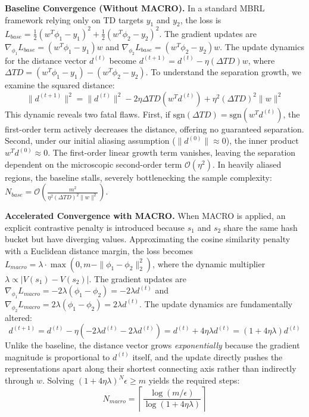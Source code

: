 \documentclass{article} %
\begin{document}
\textbf{Baseline Convergence (Without MACRO).}
In a standard MBRL framework relying only on TD targets $y_1$ and $y_2$, the loss is $L_{base} = \frac{1}{2}(w^T\phi_1 - y_1)^2 + \frac{1}{2}(w^T\phi_2 - y_2)^2$. The gradient updates are $\nabla_{\phi_1} L_{base} = (w^T\phi_1 - y_1)w$ and $\nabla_{\phi_2} L_{base} = (w^T\phi_2 - y_2)w$. 
The update dynamics for the distance vector $d^{(t)}$ become $d^{(t+1)} = d^{(t)} - \eta (\Delta TD) w$, where $\Delta TD = (w^T\phi_1 - y_1) - (w^T\phi_2 - y_2)$. To understand the separation growth, we examine the squared distance:
\begin{equation}
\|d^{(t+1)}\|^2 = \|d^{(t)}\|^2 - 2\eta \Delta TD (w^T d^{(t)}) + \eta^2 (\Delta TD)^2 \|w\|^2
\end{equation}
This dynamic reveals two fatal flaws. First, if $\text{sgn}(\Delta TD) = \text{sgn}(w^T d^{(t)})$, the first-order term actively decreases the distance, offering no guaranteed separation. Second, under our initial aliasing assumption ($\|d^{(0)}\| \approx 0$), the inner product $w^T d^{(0)} \approx 0$. The first-order linear growth term vanishes, leaving the separation dependent on the microscopic second-order term $\mathcal{O}(\eta^2)$. In heavily aliased regions, the baseline stalls, severely bottlenecking the sample complexity: $N_{base} = \mathcal{O}\left(\frac{m^2}{\eta^2 (\Delta TD)^2 \|w\|^2}\right)$.

\textbf{Accelerated Convergence with MACRO.}
When MACRO is applied, an explicit contrastive penalty is introduced because $s_1$ and $s_2$ share the same hash bucket but have diverging values. Approximating the cosine similarity penalty with a Euclidean distance margin, the loss becomes $L_{macro} = \lambda \cdot \max(0, m - \|\phi_1 - \phi_2\|_2^2)$, where the dynamic multiplier $\lambda \propto |V(s_1) - V(s_2)|$. The gradient updates are $\nabla_{\phi_1} L_{macro} = -2\lambda (\phi_1 - \phi_2) = -2\lambda d^{(t)}$ and $\nabla_{\phi_2} L_{macro} = 2\lambda (\phi_1 - \phi_2) = 2\lambda d^{(t)}$.
The update dynamics are fundamentally altered:
\begin{equation}
d^{(t+1)} = d^{(t)} - \eta \left( -2\lambda d^{(t)} - 2\lambda d^{(t)} \right) = d^{(t)} + 4\eta\lambda d^{(t)} = (1 + 4\eta\lambda) d^{(t)}
\end{equation}
Unlike the baseline, the distance vector grows \textit{exponentially} because the gradient magnitude is proportional to $d^{(t)}$ itself, and the update directly pushes the representations apart along their shortest connecting axis rather than indirectly through $w$. Solving $(1 + 4\eta\lambda)^N \epsilon \ge m$ yields the required steps:
\begin{equation}
N_{macro} = \left\lceil \frac{\log(m/\epsilon)}{\log(1 + 4\eta\lambda)} \right\rceil
\end{equation}
\end{document}
